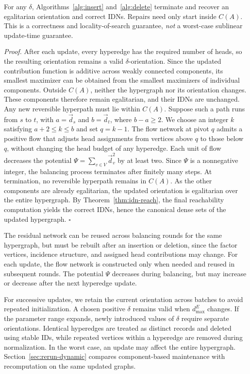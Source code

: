 \documentclass[twocolumn]{svjour3}
\begin{document}
\begin{theorem}\label{thm:dynamic}
For any $\delta$, Algorithms~\ref{alg:insert} and~\ref{alg:delete} terminate and recover an egalitarian orientation and correct IDNs. Repairs need only start inside $C(A)$. This is a correctness and locality-of-search guarantee, \emph{not} a worst-case sublinear update-time guarantee.
\end{theorem}
\emph{Proof.}
After each update, every hyperedge has the required number of
heads, so the resulting orientation remains a valid
$\delta$-orientation. Since the updated contribution function
is additive across weakly connected components, its smallest
maximizer can be obtained from the smallest maximizers of
individual components. Outside $C(A)$, neither the hypergraph
nor its orientation changes. These components therefore remain
egalitarian, and their IDNs are unchanged.
Any new reversible hyperpath must lie within $C(A)$.
Suppose such a path runs from $s$ to $t$, with
$a=\vec d_s$ and $b=\vec d_t$, where $b-a\ge2$.
We choose an integer $k$ satisfying $a+2\le k\le b$
and set $q=k-1$. The flow network at pivot $q$
admits a positive flow that adjusts head assignments
from vertices above $q$ to those below $q$, without
changing the head budget of any hyperedge.
Each unit of flow decreases the potential
$\Psi=\sum_{v\in V}\vec d_v^2$ by at least two.
Since $\Psi$ is a nonnegative integer, the balancing
process terminates after finitely many steps.
At termination, no reversible hyperpath remains in
$C(A)$. As the other components are already egalitarian,
the updated orientation is egalitarian over the entire
hypergraph. By Theorem~\ref{thm:idn-reach}, the final
reachability computation yields the correct IDNs,
hence the canonical dense sets of the updated hypergraph.
\hfill$\square$

The residual network can be reused across balancing rounds for the same hypergraph, but must be rebuilt after an insertion or deletion, since the factor vertices, incidence structure, and assigned head contributions may change. For each update, the flow network is constructed only when needed and reused in subsequent rounds. The potential $\Psi$ decreases during balancing, but may increase or decrease after the next hyperedge update.

For successive updates, we retain the current orientation across batches to avoid repeated initialization. A chosen positive $\delta$ remains valid when $d^E_{\max}$ changes. If the parameter range expands, newly introduced values of $\delta$ require separate orientations. Identical hyperedges are treated as distinct records and deleted using stable IDs, while repeated vertices within a hyperedge are removed during normalization. In the worst case, an update may affect the entire hypergraph. Section~\ref{sec:rerun-dynamic} compares component-based maintenance with recomputation on the same updated graphs.
\end{document}
